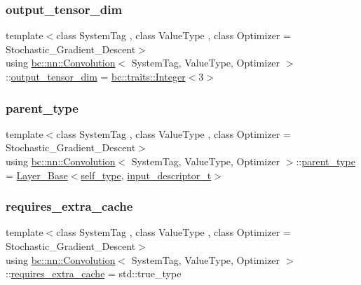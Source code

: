 \subsubsection{\texorpdfstring{output\+\_\+tensor\+\_\+dim}{output\_tensor\_dim}}
{\footnotesize\ttfamily template$<$class System\+Tag , class Value\+Type , class Optimizer  = Stochastic\+\_\+\+Gradient\+\_\+\+Descent$>$ \\
using \hyperlink{structbc_1_1nn_1_1Convolution}{bc\+::nn\+::\+Convolution}$<$ System\+Tag, Value\+Type, Optimizer $>$\+::\hyperlink{structbc_1_1nn_1_1Convolution_a20d103087eb0fa4c47e9640eae02e401}{output\+\_\+tensor\+\_\+dim} =  \hyperlink{structbc_1_1traits_1_1Integer}{bc\+::traits\+::\+Integer}$<$3$>$}

\mbox{\label{structbc_1_1nn_1_1Convolution_a3a308c5508fc0aafdac299e87e87206c}} 
\subsubsection{\texorpdfstring{parent\+\_\+type}{parent\_type}}
{\footnotesize\ttfamily template$<$class System\+Tag , class Value\+Type , class Optimizer  = Stochastic\+\_\+\+Gradient\+\_\+\+Descent$>$ \\
using \hyperlink{structbc_1_1nn_1_1Convolution}{bc\+::nn\+::\+Convolution}$<$ System\+Tag, Value\+Type, Optimizer $>$\+::\hyperlink{structbc_1_1nn_1_1Convolution_a3a308c5508fc0aafdac299e87e87206c}{parent\+\_\+type} =  \hyperlink{structbc_1_1nn_1_1Layer__Base}{Layer\+\_\+\+Base}$<$\hyperlink{structbc_1_1nn_1_1Convolution_a53ebb74b7fab047c1ad45a1f03fc8dd9}{self\+\_\+type}, \hyperlink{structbc_1_1nn_1_1Convolution_a01dcd0bf8ae2c1d94118a4f410b3e568}{input\+\_\+descriptor\+\_\+t}$>$}

\mbox{\label{structbc_1_1nn_1_1Convolution_a084b2b7a45329f1a70aab1a9333829a6}} 
\subsubsection{\texorpdfstring{requires\+\_\+extra\+\_\+cache}{requires\_extra\_cache}}
{\footnotesize\ttfamily template$<$class System\+Tag , class Value\+Type , class Optimizer  = Stochastic\+\_\+\+Gradient\+\_\+\+Descent$>$ \\
using \hyperlink{structbc_1_1nn_1_1Convolution}{bc\+::nn\+::\+Convolution}$<$ System\+Tag, Value\+Type, Optimizer $>$\+::\hyperlink{structbc_1_1nn_1_1Convolution_a084b2b7a45329f1a70aab1a9333829a6}{requires\+\_\+extra\+\_\+cache} =  std\+::true\+\_\+type}


